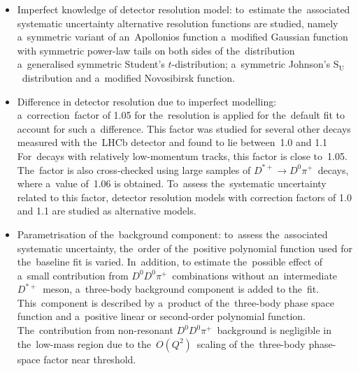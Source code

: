 \documentclass[12pt,a4paper]{article}
\def\Ppi         {\ensuremath{\uppi}\xspace}
\def\PD      {\ensuremath{\mathrm{D}}\xspace}
\def\Ppi         {\ensuremath{\pi}\xspace}
\def\PD      {\ensuremath{D}\xspace}
\def\pion   {{\ensuremath{\Ppi}}\xspace}
\def\pip    {{\ensuremath{\pion^+}}\xspace}
\def\D       {{\ensuremath{\PD}}\xspace}
\def\Dz      {{\ensuremath{\D^0}}\xspace}
\def\Dstarp  {{\ensuremath{\D^{*+}}}\xspace}
\newcommand{\decay}[2]{\ensuremath{#1\!\to #2}\xspace}
\def\to                 {\ensuremath{\rightarrow}\xspace}
\begin{document}
\begin{itemize} 
\item Imperfect knowledge of detector resolution model: 
to~estimate the~associated systematic uncertainty 
alternative resolution functions are studied, namely 
a~symmetric variant 
of an~Apollonios function a~modified Gaussian function with 
symmetric power\nobreakdash-law 
tails on  both sides of 
the~distribution a~generalised symmetric
Student's $t$\nobreakdash-distribution; a~symmetric Johnson's 
$\mathrm{S_U}$~distribution and a~modified Novosibirsk function. \item Difference in detector 
resolution due to imperfect modelling:
a~correction~factor of 1.05 for the~resolution 
is applied for the~default fit to 
account for such a~difference. 
This factor was studied for 
several other decays measured with 
the~LHCb detector
and found 
to lie between~1.0 and 
1.1~\cite{LHCb-PAPER-2020-008,LHCb-PAPER-2020-009}
For~decays with relatively 
low\nobreakdash-momentum tracks, 
this factor is close to~1.05. 
The~factor is also 
cross\nobreakdash-checked using large samples of 
\mbox{$\decay{\Dstarp}{\Dz\pip}$}~decays,
where a~value of~1.06 is obtained.
To~assess the~systematic uncertainty 
related to this factor,
detector resolution models with correction 
factors of 1.0 and 1.1 are studied 
as alternative models. 

\item Parametrisation of the~background component: 
to~assess the~associated systematic uncertainty, 
the~order of the~positive polynomial function 
used for the~baseline fit is 
varied. In~addition, to estimate the~possible 
effect of a~small contribution 
from $\Dz\Dz\pip$~combinations without 
an~intermediate \Dstarp~meson,
a~three\nobreakdash-body background component 
is added to the~fit.
This~component is described by a~product 
of the~three\nobreakdash-body phase space 
function  and a~positive linear or 
second\nobreakdash-order polynomial function. 
The~contribution from 
non\nobreakdash-resonant 
$\Dz\Dz\pip$~background 
is negligible 
in the~low\nobreakdash-mass 
region due to the~$O(Q^2)$~scaling of 
the~three\nobreakdash-body 
phase\nobreakdash-space factor near threshold.




\end{itemize}
\end{document}
